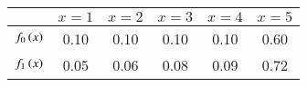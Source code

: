 \begin{tabular}{c|c c c c c}
\hline
     & $x = 1$ & $x = 2 $ & $x = 3$ & $x = 4 $ & $x = 5$\\
     \hline
    $f_0\left(x\right)$ & 0.10 & 0.10 & 0.10 & 0.10 & 0.60 \\
    \hline
    $f_1\left(x\right)$ & 0.05 & 0.06 & 0.08 & 0.09 & 0.72 \\
    \hline
\end{tabular}